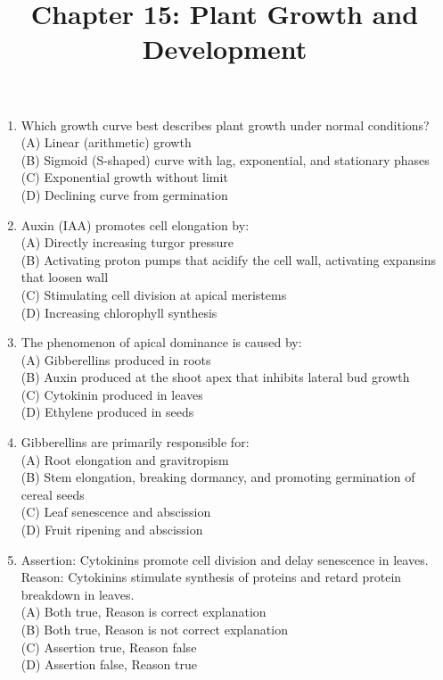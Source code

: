 \documentclass{article}
\begin{document}
\title{Chapter 15: Plant Growth and Development}
\date{}
\maketitle

\begin{enumerate}[label=Q\arabic*.]

\item Which growth curve best describes plant growth under normal conditions?
\\(A) Linear (arithmetic) growth
\\(B) Sigmoid (S-shaped) curve with lag, exponential, and stationary phases
\\(C) Exponential growth without limit
\\(D) Declining curve from germination

\item Auxin (IAA) promotes cell elongation by:
\\(A) Directly increasing turgor pressure
\\(B) Activating proton pumps that acidify the cell wall, activating expansins that loosen wall
\\(C) Stimulating cell division at apical meristems
\\(D) Increasing chlorophyll synthesis

\item The phenomenon of apical dominance is caused by:
\\(A) Gibberellins produced in roots
\\(B) Auxin produced at the shoot apex that inhibits lateral bud growth
\\(C) Cytokinin produced in leaves
\\(D) Ethylene produced in seeds

\item Gibberellins are primarily responsible for:
\\(A) Root elongation and gravitropism
\\(B) Stem elongation, breaking dormancy, and promoting germination of cereal seeds
\\(C) Leaf senescence and abscission
\\(D) Fruit ripening and abscission

\item Assertion: Cytokinins promote cell division and delay senescence in leaves.\\
Reason: Cytokinins stimulate synthesis of proteins and retard protein breakdown in leaves.
\\(A) Both true, Reason is correct explanation
\\(B) Both true, Reason is not correct explanation
\\(C) Assertion true, Reason false
\\(D) Assertion false, Reason true


\end{enumerate}
\end{document}
